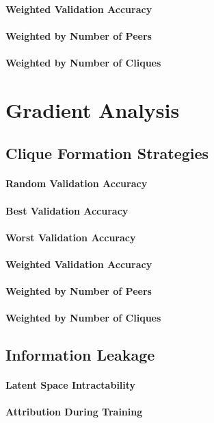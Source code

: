 \paragraph{Weighted Validation Accuracy}
\paragraph{Weighted by Number of Peers}
\paragraph{Weighted by Number of Cliques}

\section{Gradient Analysis}
\subsection{Clique Formation Strategies}
\paragraph{Random Validation Accuracy}
\paragraph{Best Validation Accuracy}
\paragraph{Worst Validation Accuracy}
\paragraph{Weighted Validation Accuracy}
\paragraph{Weighted by Number of Peers}
\paragraph{Weighted by Number of Cliques}

\subsection{Information Leakage}
\paragraph{Latent Space Intractability}
\paragraph{Attribution During Training}